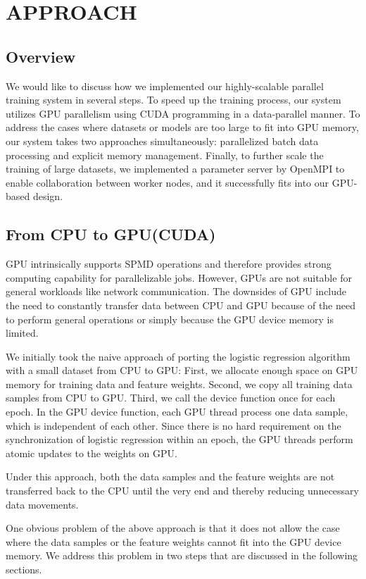 \documentclass{article}
\begin{document}
\section*{APPROACH}
\subsection*{Overview}

We would like to discuss how we implemented our highly-scalable parallel training system in several steps. To speed up the training process, our system utilizes GPU parallelism using CUDA programming in a data-parallel manner. To address the cases where datasets or models are too large to fit into GPU memory, our system takes two approaches simultaneously: parallelized batch data processing and explicit memory management. Finally, to further scale the training of large datasets, we implemented a parameter server by OpenMPI to enable collaboration between worker nodes, and it successfully fits into our GPU-based design.

\subsection*{From CPU to GPU(CUDA)}

GPU intrinsically supports SPMD operations and therefore provides strong computing capability for parallelizable jobs. However, GPUs are not suitable for general workloads like network communication. The downsides of GPU include the need to constantly transfer data between CPU and GPU because of the need to perform general operations or simply because the GPU device memory is limited.

We initially took the naive approach of porting the logistic regression algorithm with a small dataset from CPU to GPU: First, we allocate enough space on GPU memory for training data and feature weights. Second, we copy all training data samples from CPU to GPU. Third, we call the device function once for each epoch. In the GPU device function, each GPU thread process one data sample, which is independent of each other. Since there is no hard requirement on the synchronization of logistic regression within an epoch, the GPU threads perform atomic updates to the weights on GPU.

Under this approach, both the data samples and the feature weights are not transferred back to the CPU until the very end and thereby reducing unnecessary data movements. 

One obvious problem of the above approach is that it does not allow the case where the data samples or the feature weights cannot fit into the GPU device memory. We address this problem in two steps that are discussed in the following sections. 
\end{document}

